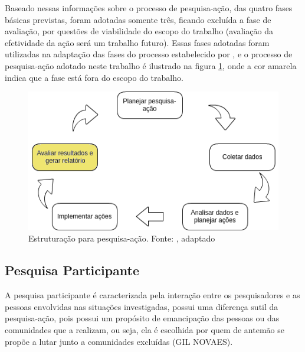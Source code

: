 Baseado nessas informações sobre o processo de pesquisa-ação, das quatro fases básicas previstas, foram adotadas somente três, ficando excluída a fase de avaliação, por questões de viabilidade do escopo do trabalho (avaliação da efetividade da ação será um trabalho futuro). Essas fases adotadas foram utilizadas na adaptação das fases do processo estabelecido por , e o processo de pesquisa-ação adotado neste trabalho é ilustrado na figura \ref{figura_pesquisa_acao}, onde a cor amarela indica que a fase está fora do escopo do trabalho.

\begin{figure}[!htb]
	\centering
	\includegraphics[scale=0.6]{figuras/estruturacao_pesquisa_acao_2}
	\caption{Estruturação para pesquisa-ação. Fonte: \cite{coughlan2002action}, adaptado}
	\label{figura_pesquisa_acao}
\end{figure}

\newpage

\subsection{Pesquisa Participante}
A pesquisa participante é caracterizada pela interação entre os pesquisadores e as pessoas envolvidas nas situações investigadas, possui uma diferença sutil da pesquisa-ação, pois possui um propósito de emancipação das pessoas ou das comunidades que a realizam, ou seja, ela é escolhida por quem de antemão se propõe a lutar junto a comunidades excluídas (GIL NOVAES).

